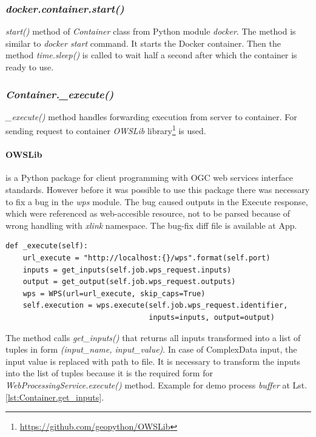 \documentclass[12pt,a4paper]{article}
\begin{document}
\subsubsection{\textit{docker.container.start()}}
\textit{start()} method of \textit{Container} class from Python module \textit{docker}. The method is similar to \textit{docker start} command. 
It starts the Docker container. Then the method \textit{time.sleep()} is called to wait half a second after which the container is ready to 
use.

\subsubsection{\textit{Container.\_execute()}}
\textit{\_execute()} method handles forwarding execution from server to container. For sending request to container \textit{OWSLib} 
library\footnote{\url{https://github.com/geopython/OWSLib}} is used. 

\paragraph{OWSLib} is a Python package for client programming with OGC web services interface standards. However before it was possible
to use this package there was necessary to fix a bug in the \textit{wps} module. The bug caused outputs in the Execute response, which
were referenced as web-accesible resource, not to be parsed because of wrong handling with \textit{xlink} namespace. The bug-fix diff file 
is available at App. 

\begin{lstlisting}[basicstyle=\small,caption={\textit{Container.\_execute()} method},label={lst:Container._execute}]
def _execute(self):
    url_execute = "http://localhost:{}/wps".format(self.port)
    inputs = get_inputs(self.job.wps_request.inputs)
    output = get_output(self.job.wps_request.outputs)
    wps = WPS(url=url_execute, skip_caps=True)
    self.execution = wps.execute(self.job.wps_request.identifier,
                                 inputs=inputs, output=output)
\end{lstlisting}

The method calls \textit{get\_inputs()} that 
returns all inputs transformed into a list of tuples in form \textit{(input\_name, input\_value)}. In case of ComplexData input, the input value is replaced with path to file. It is necessary to transform the inputs into the list of tuples because it is the required form for
\textit{WebProcessingService.execute()} method. Example for demo process \textit{buffer} at Lst. \ref{lst:Container.get_inputs}.
\end{document}
